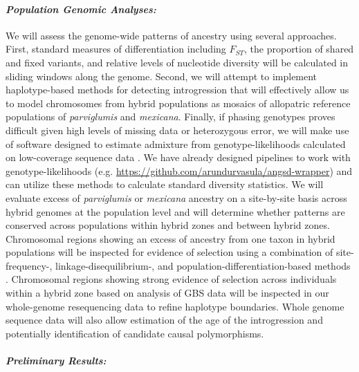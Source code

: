 \paragraph{\emph{Population Genomic Analyses:}} 
We will assess the genome-wide patterns of ancestry using several approaches.  
First, standard measures of differentiation including $F_{ST}$, the proportion of shared and fixed variants, and relative levels of nucleotide diversity \citep{Geneva2014} will be calculated in sliding windows along the genome. 
Second, we will attempt to implement haplotype-based methods for detecting introgression \citep[\emph{e.g.},][]{price2009, lawson2012} that will effectively allow us to model chromosomes from hybrid populations as mosaics of allopatric reference populations of \emph{parviglumis} and \emph{mexicana}.  
Finally, if phasing genotypes \citep{scheet2006fast} proves difficult given high levels of missing data or heterozygous error, we will make use of software designed to estimate admixture from genotype-likelihoods calculated on low-coverage sequence data \citep{skotte2013estimating}. 
We have already designed pipelines to work with genotype-likelihoods (e.g. \url{https://github.com/arundurvasula/angsd-wrapper}) and can utilize these methods to calculate standard diversity statistics.  
We will evaluate excess of \emph{parviglumis} or \emph{mexicana} ancestry on a site-by-site basis across hybrid genomes at the population level and will determine whether patterns are conserved across populations within hybrid zones and between hybrid zones.  Chromosomal regions showing an excess of ancestry from one taxon in hybrid populations will be inspected for evidence of selection using a combination of site-frequency-, linkage-disequilibrium-, and population-differentiation-based methods \citep[reviewed in][]{Vitti2013}. Chromosomal regions showing strong evidence of selection across individuals within a hybrid zone based on analysis of GBS data will be inspected in our whole-genome resequencing data to refine haplotype boundaries. 
Whole genome sequence data will also allow estimation of the age of the introgression and potentially identification of candidate causal polymorphisms.

		

\paragraph{\emph{Preliminary Results:}} 

